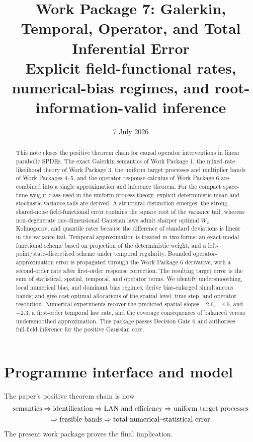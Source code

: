 \documentclass[11pt]{article}
\title{Work Package 7: Galerkin, Temporal, Operator, and Total Inferential Error\\
\large Explicit field-functional rates, numerical-bias regimes, and root-information-valid inference}
\author{}
\date{7 July 2026}
\theoremstyle{remark}
\begin{document}
\maketitle

\begin{abstract}
This note closes the positive theorem chain for causal operator interventions in linear parabolic SPDEs. The exact Galerkin semantics of Work Package 1, the mixed-rate likelihood theory of Work Package 3, the uniform target processes and multiplier bands of Work Packages 4--5, and the operator response calculus of Work Package 6 are combined into a single approximation and inference theorem. For the compact space-time weight class used in the uniform process theory, explicit deterministic-mean and stochastic-variance tails are derived. A structural distinction emerges: the strong shared-noise field-functional error contains the square root of the variance tail, whereas non-degenerate one-dimensional Gaussian laws admit sharper optimal $W_2$, Kolmogorov, and quantile rates because the difference of standard deviations is linear in the variance tail. Temporal approximation is treated in two forms: an exact-modal functional scheme based on projection of the deterministic weight, and a left-point/state-discretised scheme under temporal regularity. Bounded operator-approximation error is propagated through the Work Package 6 derivative, with a second-order rate after first-order response correction. The resulting target error is the sum of statistical, spatial, temporal, and operator terms. We identify undersmoothing, local numerical bias, and dominant bias regimes; derive bias-enlarged simultaneous bands; and give cost-optimal allocations of the spatial level, time step, and operator resolution. Numerical experiments recover the predicted spatial slopes $-2.6$, $-4.6$, and $-2.3$, a first-order temporal law rate, and the coverage consequences of balanced versus undersmoothed approximation. This package passes Decision Gate 6 and authorises full-field inference for the positive Gaussian core.
\end{abstract}

\section{Programme interface and model}

The paper's positive theorem chain is now
\[
\begin{aligned}
 &\text{semantics}\Rightarrow\text{identification}\Rightarrow\text{LAN and efficiency}\Rightarrow\text{uniform target processes}\\
 &\hspace{18mm}\Rightarrow\text{feasible bands}\Rightarrow\text{total numerical--statistical error}.
\end{aligned}
\]
The present work package proves the final implication.
\end{document}
